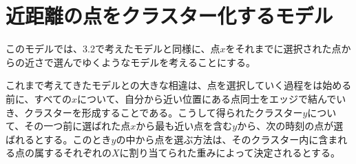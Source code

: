 \section{近距離の点をクラスター化するモデル}

このモデルでは、3.2で考えたモデルと同様に、点$x$をそれまでに選択された点からの近さで選んでゆくようなモデルを考えることにする。

これまで考えてきたモデルとの大きな相違は、点を選択していく過程をは始める前に、すべての$x$について、自分から近い位置にある点同士をエッジで結んでいき、クラスターを形成することである。こうして得られたクラスター$y$について、その一つ前に選ばれた点$x$から最も近い点を含む$y$から、次の時刻の点が選ばれるとする。このとき$y$の中から点を選ぶ方法は、そのクラスター内に含まれる点の属するそれぞれの$X$に割り当てられた重みによって決定されるとする。
